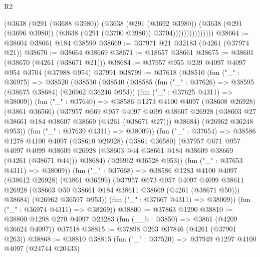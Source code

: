 \begin{lexlean}{R2}
\begin{coremodule}
                          (@3638
                            (@291 (@3688 @3980))
                            (@3638
                              (@291 (@3692 @3980))
                              (@3638
                                (@291 (@3696 @3980))
                                (@3638 (@291 (@3700 @3980)) @3704)))))))))))))))
@38664 := @38604 @38661 @184 @38590
@38669 := @37971 @21 @32183 (@4261 (@37974 @21))
@38670 := @38664 @38669
@38671 := @18657 @38661
@38675 := @38601 (@38670 (@4261 (@38671 @21)))
@38684 := @37957 @955 @239 @4097 @4097 @954 @3704 (@37988 @954) @37991
@38799 := @37618
    (@38510
      (fun ("_" : @36975) =>
      @38520
        (@38530
          (@38540
            (@38585
              (fun ("_" : @37626) => @38595 (@38675 @38684) (@26962 @36246 @953))
              (fun ("_" : @37625 @4311) => @38009))
            (fun ("_" : @37640) =>
            @38586
              @1273
              @4100
              @4097
              (@38608 @26928)
              (@3861 @36566)
              (@37957
                @669
                @957
                @4097
                @4099
                @38607
                @26928
                (@38603 @27 @38661 @184 @38607 @38669 (@4261 (@38671 @27)))
                @38684)
              (@26962 @36248 @953))
            (fun ("_" : @37639 @4311) => @38009))
          (fun ("_" : @37654) =>
          @38586
            @1278
            @4100
            @4097
            (@38610 @26928)
            (@3861 @36580)
            (@37957
              @671
              @957
              @4097
              @4099
              @38609
              @26928
              (@38603 @44 @38661 @184 @38609 @38669 (@4261 (@38671 @44)))
              @38684)
            (@26962 @36528 @953))
          (fun ("_" : @37653 @4311) => @38009))
        (fun ("_" : @37668) =>
        @38586
          @1283
          @4100
          @4097
          (@38612 @26928)
          (@3861 @36599)
          (@37957
            @673
            @957
            @4097
            @4099
            @38611
            @26928
            (@38603 @50 @38661 @184 @38611 @38669 (@4261 (@38671 @50)))
            @38684)
          (@26962 @36597 @953))
        (fun ("_" : @37667 @4311) => @38009))
      (fun ("_" : @36974 @4311) => @38269))
@38800 := @37863 @1290
@38810 := @38800 @1298 @270 @4097 @23283 (fun (__b : @3850) => @3861 (@4209 @36624 @4097)) @37518
@38815 := @37898 @263 @37846 (@4261 (@37901 @263))
@38868 := @38810
    @38815
    (fun ("_" : @37520) =>
    @37949
      @1297
      @4100
      @4097
      (@24744 @20433)

\end{coremodule}
\end{lexlean}
